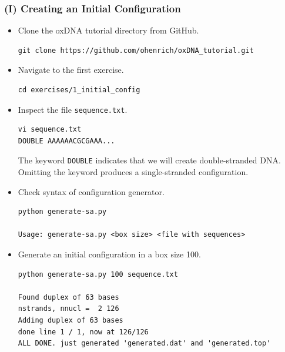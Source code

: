 \documentclass[slidestop,compress,9pt]{beamer}
\begin{document}
\begin{frame}[fragile]
\frametitle{(I) Creating an Initial Configuration}
\small

\begin{itemize}
\item Clone the oxDNA tutorial directory from GitHub.
\begin{lstlisting}
git clone https://github.com/ohenrich/oxDNA_tutorial.git 
\end{lstlisting}

\item Navigate to the first exercise.
\begin{lstlisting}
cd exercises/1_initial_config
\end{lstlisting}

\item Inspect the file \texttt{sequence.txt}.
\begin{lstlisting}
vi sequence.txt
DOUBLE AAAAAACGCGAAA...
\end{lstlisting}
The keyword \texttt{DOUBLE} indicates that we will create double-stranded DNA. Omitting the keyword produces a single-stranded configuration.

\item Check syntax of configuration generator.
\linespread{0.4}
\begin{lstlisting}
python generate-sa.py

Usage: generate-sa.py <box size> <file with sequences>
\end{lstlisting}

\item Generate an initial configuration in a box size 100.
\begin{lstlisting}
python generate-sa.py 100 sequence.txt

Found duplex of 63 bases
nstrands, nnucl =  2 126
Adding duplex of 63 bases
done line 1 / 1, now at 126/126
ALL DONE. just generated 'generated.dat' and 'generated.top'
\end{lstlisting}
\end{itemize}

\end{frame}
\end{document}
